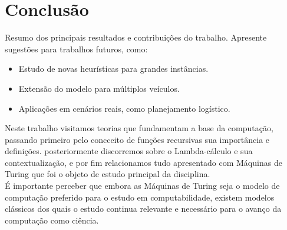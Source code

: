 \documentclass[12pt, a4paper]{report}
\begin{document}
\chapter{Conclusão}
Resumo dos principais resultados e contribuições do trabalho. Apresente sugestões para trabalhos futuros, como:
\begin{itemize}
    \item Estudo de novas heurísticas para grandes instâncias.
    \item Extensão do modelo para múltiplos veículos.
    \item Aplicações em cenários reais, como planejamento logístico.
\end{itemize}

Neste trabalho visitamos teorias que fundamentam a base da computação, passando primeiro pelo concceito de funções recursivas sua importância e definições. posteriormente discorremos sobre o Lambda-cálculo e sua contextualização, e por fim relacionamos tudo apresentado com Máquinas de Turing que foi o objeto de estudo principal da disciplina.\\
É importante perceber que embora as Máquinas de Turing seja o modelo de computação preferido para o estudo em computabilidade, existem modelos clássicos dos quais o estudo continua relevante e necessário para o avanço da computação como ciência.

\newpage
\renewcommand{\refname}{Referências Bibliográficas}

\nocite{gomes2016, gomes2018, salvador, machado, ramos, carnielli}
\end{document}
